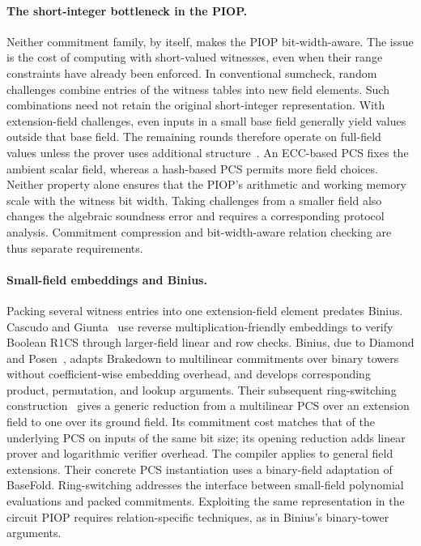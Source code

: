 \paragraph{The short-integer bottleneck in the PIOP.}
Neither commitment family, by itself, makes the PIOP bit-width-aware.
The issue is the cost of computing with short-valued witnesses,
even when their range constraints have already been enforced.
In conventional sumcheck, random challenges combine entries of the
witness tables into new field elements.
Such combinations need not retain the original short-integer
representation. With extension-field challenges, even inputs in a
small base field generally yield values outside that base field.
The remaining rounds therefore operate on full-field values unless
the prover uses additional structure~\cite{iacr/BagadDDT25}.
An ECC-based PCS fixes the ambient scalar field, whereas a hash-based
PCS permits more field choices. Neither property alone ensures that
the PIOP's arithmetic and working memory scale with the witness bit
width. Taking challenges from a smaller field also changes the
algebraic soundness error and requires a corresponding protocol
analysis. Commitment compression and bit-width-aware relation
checking are thus separate requirements.

\paragraph{Small-field embeddings and Binius.}
Packing several witness entries into one extension-field element
predates Binius. Cascudo and Giunta~\cite{iacr/CascudoG21} use
reverse multiplication-friendly embeddings to verify Boolean R1CS
through larger-field linear and row checks.
Binius, due to Diamond and Posen~\cite{eurocrypt/DiamondP25},
adapts Brakedown to multilinear commitments over binary towers
without coefficient-wise embedding overhead, and develops
corresponding product, permutation, and lookup arguments.
Their subsequent ring-switching construction~\cite{eurocrypt/DiamondP26}
gives a generic reduction from a multilinear PCS over an extension
field to one over its ground field.
Its commitment cost matches that of the underlying PCS on inputs
of the same bit size; its opening reduction adds linear prover
and logarithmic verifier overhead.
The compiler applies to general field extensions. Their concrete
PCS instantiation uses a binary-field adaptation of BaseFold.
Ring-switching addresses the interface between small-field polynomial
evaluations and packed commitments. Exploiting the same representation
in the circuit PIOP requires relation-specific techniques, as in
Binius's binary-tower arguments.

